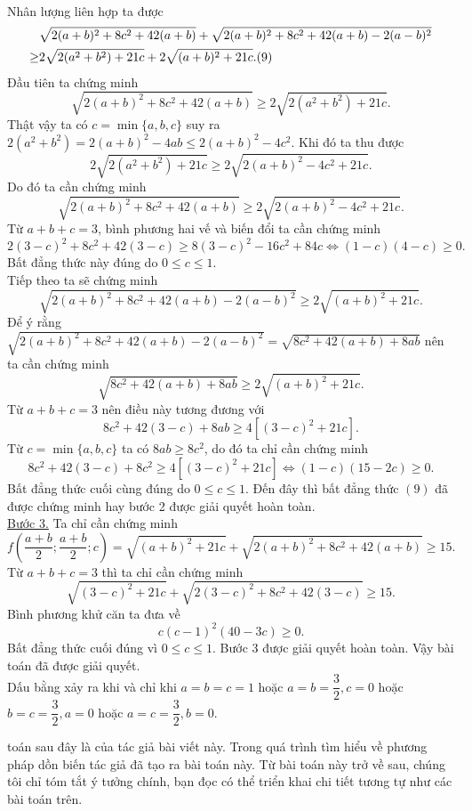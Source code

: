 {\begin{bt}
{\begin{align*}
		\end{align*}
		Nhân lượng liên hợp ta được
		\begin{align*}
		&\sqrt{2(a+b)^2+8c^2+42(a+b)}+\sqrt{2(a+b)^2+8c^2+42(a+b)-2(a-b)^2}\\
		\ge &2\sqrt{2(a^2+b^2)+21c}+2\sqrt{(a+b)^2+21c}.\hfill(9)
		\end{align*}
		Đầu tiên ta chứng minh 
		$$\sqrt{2(a+b)^2+8c^2+42(a+b)}\ge 2\sqrt{2(a^2+b^2)+21c}.$$
		Thật vậy ta có $c=\min \{a,b,c\}$ suy ra $2(a^2+b^2)=2(a+b)^2-4ab\le 2(a+b)^2-4c^2$. Khi đó ta thu được
		$$2\sqrt{2(a^2+b^2)+21c}\ge 2\sqrt{2(a+b)^2-4c^2+21c}.$$
		Do đó ta cần chứng minh 
		$$\sqrt{2(a+b)^2+8c^2+42(a+b)}\ge 2\sqrt{2(a+b)^2-4c^2+21c}.$$
		Từ $a+b+c=3$, bình phương hai vế và biến đổi ta cần chứng minh
		$$2(3-c)^2+8c^2+42(3-c)\ge 8(3-c)^2-16c^2+84c\Leftrightarrow (1-c)(4-c)\ge 0.$$
		Bất đẳng thức này đúng do $0\le c\le 1$.\\
		Tiếp theo ta sẽ chứng minh 
		$$\sqrt{2(a+b)^2+8c^2+42(a+b)-2(a-b)^2}\ge 2\sqrt{(a+b)^2+21c}.$$
		Để ý rằng $\sqrt{2(a+b)^2+8c^2+42(a+b)-2(a-b)^2}=\sqrt{8c^2+42(a+b)+8ab}$ nên ta cần chứng minh 
		$$\sqrt{8c^2+42(a+b)+8ab}\ge 2\sqrt{(a+b)^2+21c}.$$
		Từ $a+b+c=3$ nên điều này tương đương với
		$$8c^2+42(3-c)+8ab\ge 4[(3-c)^2+21c].$$ 
		Từ $c=\min\{a,b,c\}$ ta có $8ab\ge 8c^2$, do đó ta chỉ cần chứng minh
		$$8c^2+42(3-c)+8c^2\ge 4[(3-c)^2+21c]\Leftrightarrow (1-c)(15-2c)\ge 0.$$
		Bất đẳng thức cuối cùng đúng do $0\le c\le 1$. Đến đây thì bất đẳng thức $(9)$ đã được chứng minh hay bước 2 được giải quyết hoàn toàn.\\
		\underline{Bước 3.} Ta chỉ cần chứng minh
		$$f\left(\dfrac{a+b}{2};\dfrac{a+b}{2};c\right)= \sqrt{(a+b)^2+21c}+\sqrt{2(a+b)^2+8c^2+42(a+b)}\ge 15.$$
		Từ $a+b+c=3$ thì ta chỉ cần chứng minh
		$$\sqrt{(3-c)^2+21c}+\sqrt{2(3-c)^2+8c^2+42(3-c)}\ge 15.$$ 
		Bình phương khử căn ta đưa về $$c(c-1)^2(40-3c)\ge 0.$$
		Bất đẳng thức cuối đúng vì $0\le c\le 1$. Bước 3 được giải quyết hoàn toàn. Vậy bài toán đã được giải quyết.\\
		Dấu bằng xảy ra khi và chỉ khi $a=b=c=1$ hoặc $a=b=\dfrac{3}{2},c=0$ hoặc $b=c=\dfrac{3}{2},a=0$ hoặc $a=c=\dfrac{3}{2},b=0$.
	}
\end{bt}
 toán sau đây là của tác giả bài viết này. Trong quá trình tìm hiểu về phương pháp dồn biến tác giả đã tạo ra bài toán này. Từ bài toán này trở về sau, chúng tôi chỉ tóm tắt ý tưởng chính, bạn đọc có thể triển khai chi tiết tương tự như các bài toán trên.
\begin{bt}%

\end{bt}}
